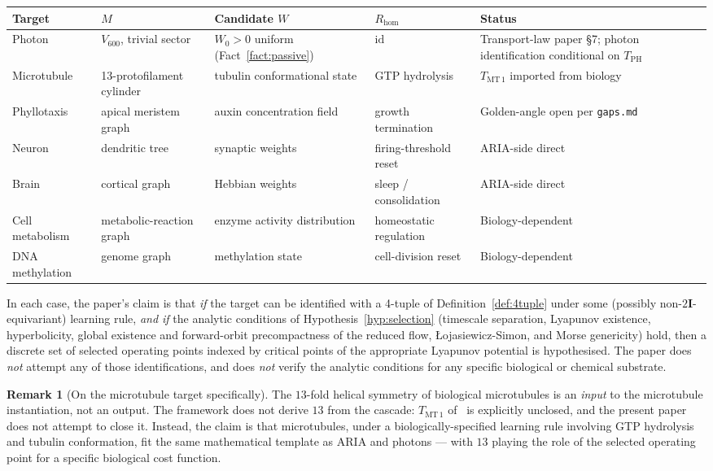 \documentclass[11pt]{article}
\theoremstyle{definition}
\newtheorem{remark}[theorem]{Remark}
\newcommand{\twoI}{2\mathbf{I}}
\begin{document}
\begin{center}\footnotesize
\begin{tabular}{@{}p{1.6cm}p{2.6cm}p{2.6cm}p{1.9cm}p{4.7cm}@{}}
\toprule
Target & $M$ & Candidate $W$ & $R_{\mathrm{hom}}$ & Status \\
\midrule
Photon & $V_{600}$, trivial sector & $W_0 > 0$ uniform (Fact~\ref{fact:passive}) & $\mathrm{id}$ & Transport-law paper \S 7; photon identification conditional on $T_{\text{PH}}$ \\
Microtubule & 13-protofilament cylinder & tubulin conformational state & GTP hydrolysis & $T_{\text{MT}\,1}$ imported from biology \\
Phyllotaxis & apical meristem graph & auxin concentration field & growth termination & Golden-angle open per \texttt{gaps.md} \\
Neuron & dendritic tree & synaptic weights & firing-threshold reset & ARIA-side direct \\
Brain & cortical graph & Hebbian weights & sleep / consolidation & ARIA-side direct \\
Cell metabolism & metabolic-reaction graph & enzyme activity distribution & homeostatic regulation & Biology-dependent \\
DNA methylation & genome graph & methylation state & cell-division reset & Biology-dependent \\
\bottomrule
\end{tabular}
\end{center}

In each case, the paper's claim is that \emph{if} the target can be identified with a 4-tuple of Definition~\ref{def:4tuple} under some (possibly non-$\twoI$-equivariant) learning rule, \emph{and if} the analytic conditions of Hypothesis~\ref{hyp:selection} (timescale separation, Lyapunov existence, hyperbolicity, global existence and forward-orbit precompactness of the reduced flow, {\L}ojasiewicz-Simon, and Morse genericity) hold, then a discrete set of selected operating points indexed by critical points of the appropriate Lyapunov potential is hypothesised. The paper does \emph{not} attempt any of those identifications, and does \emph{not} verify the analytic conditions for any specific biological or chemical substrate.

\begin{remark}[On the microtubule target specifically]
The $13$-fold helical symmetry of biological microtubules is an \emph{input} to the microtubule instantiation, not an output. The framework does not derive $13$ from the cascade: $T_{\text{MT}\,1}$ of~\citep{CascadeAlphaChain} is explicitly unclosed, and the present paper does not attempt to close it. Instead, the claim is that microtubules, under a biologically-specified learning rule involving GTP hydrolysis and tubulin conformation, fit the same mathematical template as ARIA and photons --- with $13$ playing the role of the selected operating point for a specific biological cost function.
\end{remark}
\end{document}

